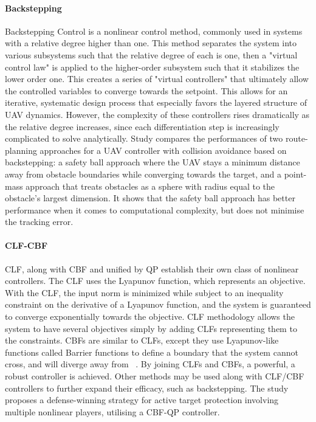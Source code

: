 \paragraph*{Backstepping}
Backstepping Control is a nonlinear control method, commonly used in systems with a relative degree higher than one. This method separates the system into various subsystems such that the relative degree of each is one, then a "virtual control law" is applied to the higher-order subsystem such that it stabilizes the lower order one. This creates a series of "virtual controllers" that ultimately allow the controlled variables to converge towards the setpoint. This allows for an iterative, systematic design process that especially favors the layered structure of UAV dynamics. However, the complexity of these controllers rises dramatically as the relative degree increases, since each differentiation step is increasingly complicated to solve analytically. Study \cite{QingboG} compares the performances of two route-planning approaches for a UAV controller with collision avoidance based on backstepping: a safety ball approach where the UAV stays a minimum distance away from obstacle boundaries while converging towards the target, and a point-mass approach that treats obstacles as a sphere with radius equal to the obstacle's largest dimension. It shows that the safety ball approach has better performance when it comes to computational complexity, but does not minimise the tracking error.

\paragraph*{CLF-CBF}
\gls{CLF}, along with \gls{CBF} and unified by \gls{QP} establish their own class of nonlinear controllers. The CLF uses the Lyapunov function, which represents an objective. With the CLF, the input norm is minimized while subject to an inequality constraint on the derivative of a Lyapunov function, and the system is guaranteed to converge exponentially towards the objective. CLF methodology allows the system to have several objectives simply by adding CLFs representing them to the constraints. CBFs are similar to CLFs, except they use Lyapunov-like functions called Barrier functions to define a boundary that the system cannot cross, and will diverge away from ~\cite{AmesA}. By joining CLFs and CBFs, a powerful, a robust controller is achieved. Other methods may be used along with CLF/CBF controllers to further expand their efficacy, such as backstepping. The study ~\cite{LiB} proposes a defense-winning strategy for active target protection involving multiple nonlinear players, utilising a CBF-QP controller. \\

